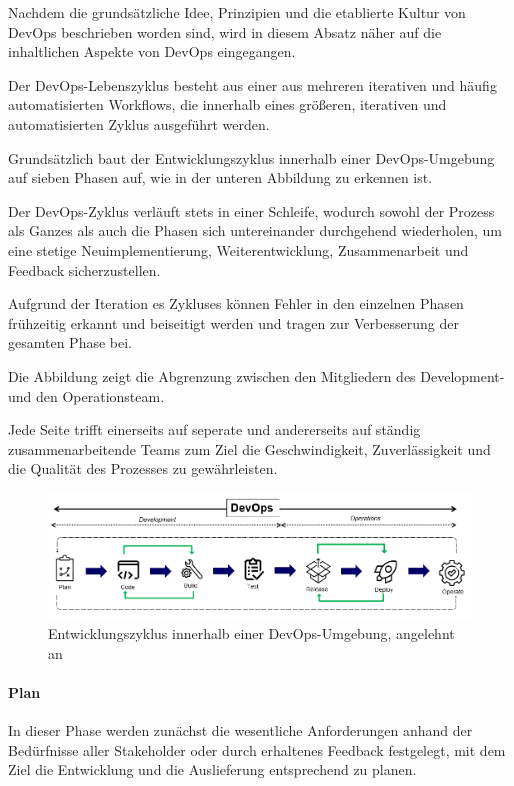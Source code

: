 Nachdem die grundsätzliche Idee, Prinzipien und die etablierte Kultur von DevOps beschrieben worden sind, wird in diesem Absatz näher auf die inhaltlichen Aspekte von DevOps eingegangen.

Der DevOps-Lebenszyklus besteht aus einer aus mehreren iterativen und häufig automatisierten Workflows, die innerhalb eines größeren, iterativen und automatisierten Zyklus ausgeführt werden.

Grundsätzlich baut der Entwicklungszyklus innerhalb einer DevOps-Umgebung auf sieben Phasen auf, wie in der unteren Abbildung zu erkennen ist.

Der DevOps-Zyklus verläuft stets in einer Schleife, wodurch sowohl der Prozess als Ganzes als auch die Phasen sich untereinander durchgehend wiederholen, um eine stetige Neuimplementierung, Weiterentwicklung, Zusammenarbeit und Feedback sicherzustellen. 

Aufgrund der Iteration es Zykluses können Fehler in den einzelnen Phasen frühzeitig erkannt und beiseitigt werden und tragen zur Verbesserung der gesamten Phase bei. 

Die Abbildung zeigt die Abgrenzung zwischen den Mitgliedern des Development- und den Operationsteam.

Jede Seite trifft einerseits auf seperate und andererseits auf ständig zusammenarbeitende Teams zum Ziel die Geschwindigkeit, Zuverlässigkeit und die Qualität des Prozesses zu gewährleisten. 

\begin{figure}[h]
    \centering
    \includegraphics[scale=0.6]{Bilder/DevOps Lebenszyklus.png}
    \caption{Entwicklungszyklus innerhalb einer DevOps-Umgebung, angelehnt an \cite[S. 16]{halstenberg_devops_2020}}
\end{figure}

\paragraph{Plan}

In dieser Phase werden zunächst die wesentliche Anforderungen anhand der Bedürfnisse aller Stakeholder oder durch erhaltenes Feedback festgelegt, mit dem Ziel die Entwicklung und die Auslieferung entsprechend zu planen. \cite[s. 16]{halstenberg_devops_2020}  

